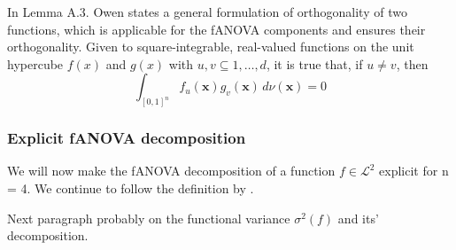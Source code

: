 In Lemma A.3. Owen states a general formulation of orthogonality of two functions, which is applicable for the fANOVA components and ensures their orthogonality.
Given to square-integrable, real-valued functions on the unit hypercube $f(x)$ and $g(x)$ with $u,v \subseteq {1, \dots, d}$, it is true that, if $u \neq v$, then
\[
\int_{[0,1]^n} f_u(\mathbf{x}) g_v(\mathbf{x}) \, d\nu(\mathbf{x}) = 0
\]


\subsubsection{Explicit fANOVA decomposition}
We will now make the fANOVA decomposition of a function $f \in \mathcal{L}^2$ explicit for n = 4. We continue to follow the definition by \cite{sobol_global_2001}.


Next paragraph probably on the functional variance $\sigma^2(f)$ and its' decomposition.

